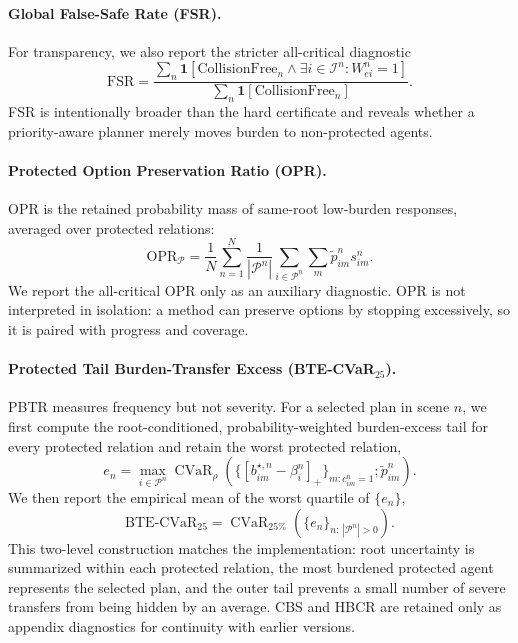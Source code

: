 \documentclass[10pt]{article}
\begin{document}
\paragraph{Global False-Safe Rate (FSR).}
For transparency, we also report the stricter all-critical diagnostic
\begin{equation}
    \mathrm{FSR}
    =
    \frac{
    \sum_{n}
    \mathbf{1}
    [
    \mathrm{CollisionFree}_n
    \wedge
    \exists i\in\mathcal I^n: W^n_{ei}=1
    ]
    }{
    \sum_{n}
    \mathbf{1}[\mathrm{CollisionFree}_n]
    }.
\end{equation}
FSR is intentionally broader than the hard certificate and reveals whether a priority-aware planner merely moves burden to non-protected agents.

\paragraph{Protected Option Preservation Ratio (OPR).}
OPR is the retained probability mass of same-root low-burden responses, averaged over protected relations:
\begin{equation}
    \mathrm{OPR}_{\mathcal P}
    =
    \frac{1}{N}
    \sum_{n=1}^{N}
    \frac{1}{|\mathcal{P}^n|}
    \sum_{i\in\mathcal{P}^n}
    \sum_m \widetilde p^n_{im}s^n_{im}.
\end{equation}
We report the all-critical OPR only as an auxiliary diagnostic. OPR is not interpreted in isolation: a method can preserve options by stopping excessively, so it is paired with progress and coverage.

\paragraph{Protected Tail Burden-Transfer Excess (BTE-CVaR$_{25}$).}
PBTR measures frequency but not severity.  For a selected plan in scene $n$, we first compute the root-conditioned, probability-weighted burden-excess tail for every protected relation and retain the worst protected relation,
\begin{equation}
    e_n
    =
    \max_{i\in\mathcal P^n}
    \operatorname{CVaR}_{\rho}
    \left(
      \{[b^{\star,n}_{im}-\beta_i^n]_+\}_{m:c^n_{im}=1};
      \widetilde p^n_{im}
    \right).
\end{equation}
We then report the empirical mean of the worst quartile of $\{e_n\}$,
\begin{equation}
    \mathrm{BTE\mbox{-}CVaR}_{25}
    =
    \operatorname{CVaR}_{25\%}\left(\{e_n\}_{n:\,|\mathcal P^n|>0}\right).
\end{equation}
This two-level construction matches the implementation: root uncertainty is summarized within each protected relation, the most burdened protected agent represents the selected plan, and the outer tail prevents a small number of severe transfers from being hidden by an average.  CBS and HBCR are retained only as appendix diagnostics for continuity with earlier versions.
\end{document}
